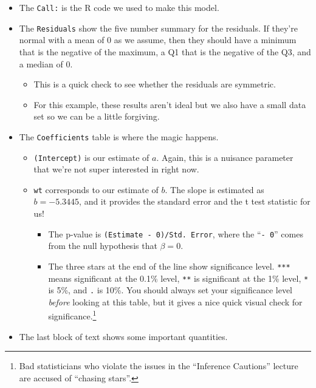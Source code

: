 \documentclass[
  letterpaper,
  DIV=11,
  numbers=noendperiod]{scrreprt}
\providecommand{\tightlist}{%
  \setlength{\itemsep}{0pt}\setlength{\parskip}{0pt}}\usepackage{longtable,booktabs,array}
\begin{document}
\begin{itemize}
\tightlist
\item
  The \texttt{Call:} is the R code we used to make this model.
\item
  The \texttt{Residuals} show the five number summary for the residuals.
  If they're normal with a mean of 0 as we assume, then they should have
  a minimum that is the negative of the maximum, a Q1 that is the
  negative of the Q3, and a median of 0.

  \begin{itemize}
  \tightlist
  \item
    This is a quick check to see whether the residuals are symmetric.
  \item
    For this example, these results aren't ideal but we also have a
    small data set so we can be a little forgiving.
  \end{itemize}
\item
  The \texttt{Coefficients} table is where the magic happens.

  \begin{itemize}
  \tightlist
  \item
    \texttt{(Intercept)} is our estimate of \(a\). Again, this is a
    nuisance parameter that we're not super interested in right now.
  \item
    \texttt{wt} corresponds to our estimate of \(b\). The slope is
    estimated as \(b=-5.3445\), and it provides the standard error and
    the t test statistic for us!

    \begin{itemize}
    \tightlist
    \item
      The p-value is \texttt{(Estimate\ -\ 0)/Std.\ Error}, where the
      ``\texttt{-\ 0}'' comes from the null hypothesis that
      \(\beta = 0\).
    \item
      The three stars at the end of the line show significance level.
      \texttt{***} means significant at the 0.1\% level, \texttt{**} is
      significant at the 1\% level, \texttt{*} is 5\%, and \texttt{.} is
      10\%. You should always set your significance level \emph{before}
      looking at this table, but it gives a nice quick visual check for
      significance.\footnote{Bad statisticians who violate the issues in
        the ``Inference Cautions'' lecture are accused of ``chasing
        stars''.}
    \end{itemize}
  \end{itemize}
\item
  The last block of text shows some important quantities.


\end{itemize}
\end{document}
